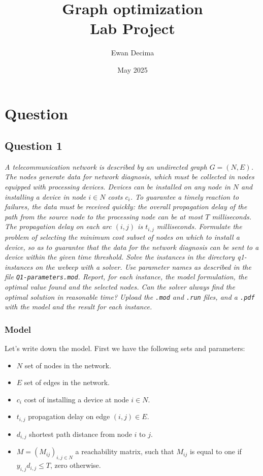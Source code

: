 \documentclass[10pt]{article}
\title{Graph optimization \\ Lab Project}
\author{Ewan Decima}
\date{May 2025}
\begin{document}
    \maketitle

    \section{Question}

    \subsection*{Question 1}
    \textit{A telecommunication network is described by an undirected graph $G=(N,E)$. The nodes generate data for network diagnosis, which must be collected in nodes equipped with processing devices. Devices can be installed on any node in $N$ and installing a device in node $i \in N$ costs $c_i$. To guarantee a timely reaction to failures, the data must be received quickly: the overall propagation delay of the path from the source node to the processing node can be at most $T$ milliseconds. The propagation delay on each arc $(i,j)$ is $t_{i,j}$ milliseconds. Formulate the problem of selecting the minimum cost subset of nodes on which to install a device, so as to guarantee that the data for the network diagnosis can be sent to a device within the given time threshold.
    Solve the instances in the directory q1-instances on the webeep with a solver. Use parameter names as described in the file \texttt{Q1-parameters.mod}.
    Report, for each instance, the model formulation, the optimal value found and the selected nodes. Can the solver always find the optimal solution in reasonable time? Upload the \texttt{.mod} and \texttt{.run} files, and a \texttt{.pdf} with the model and the result for each instance.}

    \vspace{1 cm}

    \subsubsection{Model}
    Let's write down the model. First we have the following sets and parameters:
    \begin{itemize}
        \item $N$ set of nodes in the network.
        \item $E$ set of edges in the network.
        \item $c_i$ cost of installing a device at node $i \in N$.
        \item $t_{i,j}$ propagation delay on edge $(i,j) \in E$.
        \item $d_{i,j}$ shortest path distance from node $i$ to $j$.
        \item $M = (M_{ij})_{i,j \in N}$ a reachability matrix, such that $M_{ij}$ is equal to one if $y_{i,j} d_{i,j} \le T$, zero otherwise.
    \end{itemize}
\end{document}
